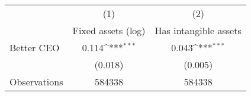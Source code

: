 {
\def\sym#1{\ifmmode^{#1}\else\(^{#1}\)\fi}
\begin{tabular}{l*{2}{c}}
\hline\hline
                    &\multicolumn{1}{c}{(1)}&\multicolumn{1}{c}{(2)}\\
                    &\multicolumn{1}{c}{Fixed assets (log)}&\multicolumn{1}{c}{Has intangible assets}\\
\hline
Better CEO          &       0.114\sym{***}&       0.043\sym{***}\\
                    &     (0.018)         &     (0.005)         \\
\hline
Observations        &      584338         &      584338         \\
\hline\hline
\end{tabular}
}
